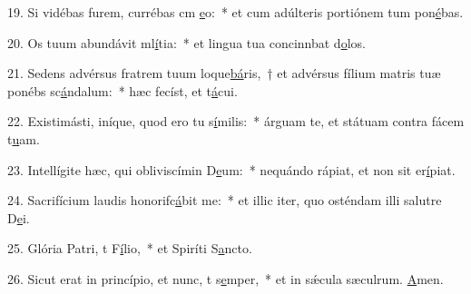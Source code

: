 19. Si vidébas furem, currébas cm \uline{e}o:~* et cum adúlteris portiónem tum pon\uline{é}bas.\par 
20. Os tuum abundávit ml\uline{í}tia:~* et lingua tua concinnbat d\uline{o}los.\par 
21. Sedens advérsus fratrem tuum loque\uline{bá}ris,~† et advérsus fílium matris tuæ ponébs sc\uline{á}ndalum:~* hæc fecíst, et t\uline{á}cui.\par 
22. Existimásti, iníque, quod ero tu s\uline{í}milis:~* árguam te, et státuam contra fácem t\uline{u}am.\par 
23. Intellígite hæc, qui obliviscímin D\uline{e}um:~* nequándo rápiat, et non sit  er\uline{í}piat.\par 
24. Sacrifícium laudis honorifc\uline{á}bit me:~* et illic iter, quo osténdam illi salutre D\uline{e}i.\par 
25. Glória Patri, t F\uline{í}lio,~* et Spiríti S\uline{a}ncto.\par 
26. Sicut erat in princípio, et nunc, t s\uline{e}mper,~* et in sǽcula sæculrum. \uline{A}men.\par 
